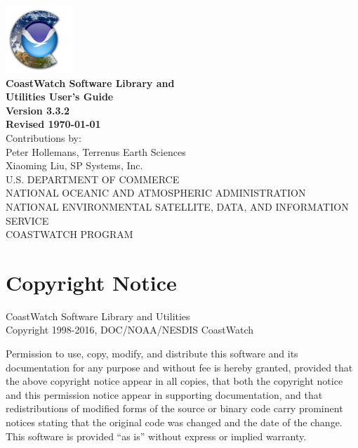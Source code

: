 \begin{titlepage}

  \begin{center}
    \includegraphics[height=1in]{icons/cdat.png} \\
    \vspace{0.5cm}
    {\Large \bf CoastWatch Software Library and \\ Utilities User's Guide} \\
    \vspace{1cm}
    {\large \bf Version 3.3.2 \\ Revised \today} \\
    \vspace{6cm} 
    {\small Contributions by: \\ Peter Hollemans, Terrenus Earth Sciences} \\
    {\small Xiaoming Liu, SP Systems, Inc.} \\
    \vspace{2cm}
    {\small U.S. DEPARTMENT OF COMMERCE \\
    NATIONAL OCEANIC AND ATMOSPHERIC ADMINISTRATION \\
    NATIONAL ENVIRONMENTAL SATELLITE, DATA, AND INFORMATION SERVICE \\
    COASTWATCH PROGRAM} \\
  \end{center}

\end{titlepage}


\section*{Copyright Notice}

CoastWatch Software Library and Utilities \\
Copyright 1998-2016, DOC/NOAA/NESDIS CoastWatch

Permission to use, copy, modify, and distribute this software and
its documentation for any purpose and without fee is hereby granted,
provided that the above copyright notice appear in all copies, that
both the copyright notice and this permission notice appear in
supporting documentation, and that redistributions of modified forms
of the source or binary code carry prominent notices stating that the
original code was changed and the date of the change.  This software
is provided ``as is'' without express or implied warranty.

